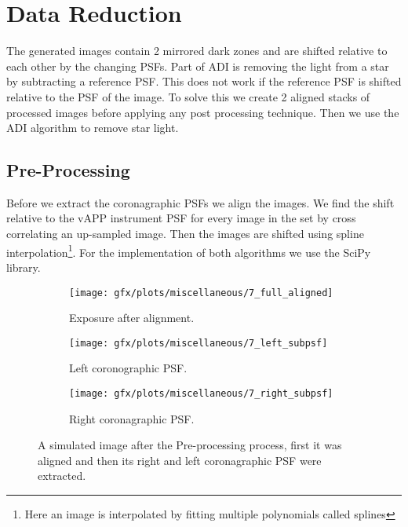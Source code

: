 
\chapter{Data Reduction} %
\label{ch:data_red} %
The generated images contain 2 mirrored dark zones and are shifted relative to each other by the changing \acp{PSF}. Part of \ac{ADI} is removing the light from a star by subtracting a reference \ac{PSF}. This does not work if the reference \ac{PSF} is shifted relative to the \ac{PSF} of the image. To solve this we create 2 aligned stacks of processed images before applying any post processing technique. Then we use the \ac{ADI} algorithm to remove star light.

\section{Pre-Processing}
Before we extract the coronagraphic \acp{PSF} we align the images. We find the shift relative to the \ac{vAPP} instrument \ac{PSF} for every image in the set by cross correlating an up-sampled image. Then the images are shifted using spline interpolation\footnote{Here an image is interpolated by fitting multiple polynomials called splines}. For the implementation of both algorithms we use the SciPy library\cite{scipy}.

\begin{figure}[h!]
  
      \begin{subfigure}[b]{0.5\textwidth}
        \texttt{[image: gfx/plots/miscellaneous/7\_full\_aligned]}
        \caption{Exposure after alignment.}
      \end{subfigure}%
      
      \begin{subfigure}[b]{0.5\textwidth}
        \texttt{[image: gfx/plots/miscellaneous/7\_left\_subpsf]}
        \caption{Left coronographic \ac{PSF}.}
        \label{fig:slice_a}
      \end{subfigure}      
      \begin{subfigure}[b]{0.5\textwidth}
        \texttt{[image: gfx/plots/miscellaneous/7\_right\_subpsf]}
        \caption{Right coronagraphic \ac{PSF}.}
        \label{fig:slice_b}
      \end{subfigure}%

  \caption{A simulated image after the Pre-processing process, first it was aligned and then its right and left coronagraphic \ac{PSF} were extracted.}
  \label{fig:psf_kernals}
\end{figure}

